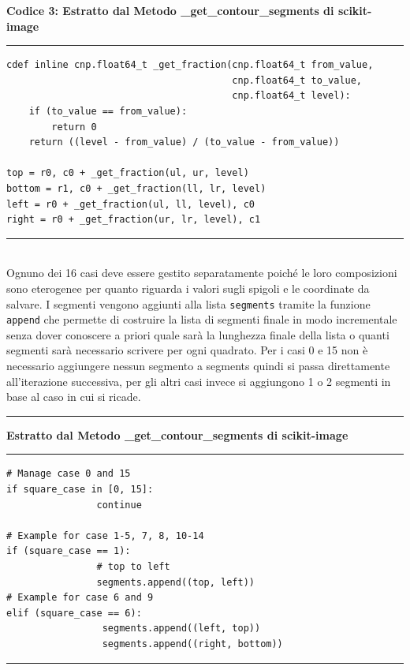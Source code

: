 \documentclass[12pt,a4paper]{report}
\begin{document}
\small{\textbf{Codice 3: Estratto dal Metodo \_get\_contour\_segments di scikit-image}} \\
\noindent\rule[0.5ex]{\linewidth}{1pt}
\begin{lstlisting}
cdef inline cnp.float64_t _get_fraction(cnp.float64_t from_value,
                                        cnp.float64_t to_value,
                                        cnp.float64_t level):
    if (to_value == from_value):
        return 0
    return ((level - from_value) / (to_value - from_value))

top = r0, c0 + _get_fraction(ul, ur, level)
bottom = r1, c0 + _get_fraction(ll, lr, level)
left = r0 + _get_fraction(ul, ll, level), c0
right = r0 + _get_fraction(ur, lr, level), c1
\end{lstlisting}
\noindent\rule[0.5ex]{\linewidth}{1pt} \\[10pt]
Ognuno dei 16 casi deve essere gestito separatamente poiché le loro composizioni sono eterogenee per quanto riguarda i valori sugli spigoli e le coordinate da salvare.  
I segmenti vengono aggiunti alla lista  \verb|segments| tramite la funzione  \verb|append| che permette di costruire la lista di segmenti finale in modo incrementale senza dover conoscere a priori quale sarà la lunghezza finale della lista o quanti segmenti sarà necessario scrivere per ogni quadrato.  Per i casi 0 e 15 non è necessario aggiungere nessun segmento a segments quindi si passa direttamente all'iterazione successiva, per gli altri casi invece si aggiungono 1 o 2 segmenti in base al caso in cui si ricade.\\[10pt]
\noindent\rule[0.5ex]{\linewidth}{2pt}
\small{\textbf{Estratto dal Metodo \_get\_contour\_segments di scikit-image}} \\
\noindent\rule[0.5ex]{\linewidth}{1pt}
\begin{lstlisting}
# Manage case 0 and 15
if square_case in [0, 15]:
                continue

# Example for case 1-5, 7, 8, 10-14
if (square_case == 1): 
                # top to left
                segments.append((top, left))
# Example for case 6 and 9
elif (square_case == 6):
                 segments.append((left, top))
                 segments.append((right, bottom))
\end{lstlisting}
\noindent\rule[0.5ex]{\linewidth}{1pt} \newpage

\end{document}
